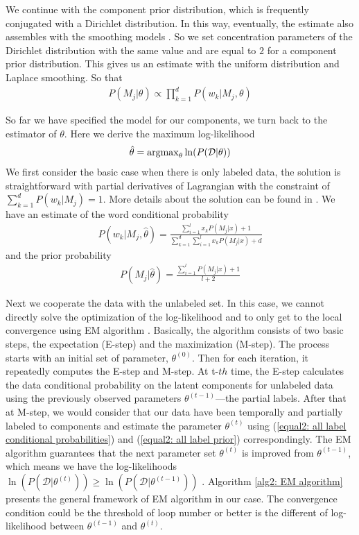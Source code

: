 We continue with the component prior distribution, which is frequently conjugated with a Dirichlet distribution. In this way, eventually, the estimate also assembles with the smoothing models \parencite{Chen1999}. So we set concentration parameters of the Dirichlet distribution with the same value and are equal to $2$ for a component prior distribution. This gives us an estimate with the uniform distribution and Laplace smoothing. So that
\begin{align}
	P(M_j|\theta) \propto \prod_{k=1}^{d} P(w_k | M_j, \theta)
\end{align}

So far we have specified the model for our components, we turn back to the estimator of $\theta$. Here we derive the maximum log-likelihood
\begin{align}
	\hat{\theta} = \operatorname{argmax}_{\theta}{\ln(P(\mathcal{D} | \theta))}
\end{align}
We first consider the basic case when there is only labeled data, the solution is straightforward with partial derivatives of Lagrangian with the constraint of $\sum_{k=1}^{d}{P(w_k | M_j)} = 1$. More details about the solution can be found in \parencite{Collins2013}. We have an estimate of the word conditional probability
\begin{align}
\label{equal2: all label conditional probabilities}
	P(w_k | M_j, \hat{\theta}) = \frac{
		\sum_{i=1}^{l}{x_k P(M_j|x)} + 1
	}{
		\sum_{k=1}^{d}\sum_{i=1}^{l}{x_k P(M_j|x)} + d
	}
\end{align}
and the prior probability
\begin{align}
\label{equal2: all label prior}
	P(M_j | \hat{\theta}) = \frac{
		\sum_{i=1}^{l} P(M_j | x) + 1
	}{
		l + 2
	}
\end{align}

Next we cooperate the data with the unlabeled set. In this case, we cannot directly solve the optimization of the log-likelihood and to only get to the local convergence using EM algorithm \parencite{10.2307/2984875}. Basically, the algorithm consists of two basic steps, the expectation (E-step) and the maximization (M-step). The process starts with an initial set of parameter, $\theta^{(0)}$. Then for each iteration, it repeatedly computes the E-step and M-step. At t-$th$ time, the E-step calculates the data conditional probability on the latent components for unlabeled data using the previously observed parameters $\theta^{(t-1)}$---the partial labels. After that at M-step, we would consider that our data have been temporally and partially labeled to components and estimate the parameter $\theta^{(t)}$ using (\ref{equal2: all label conditional probabilities}) and (\ref{equal2: all label prior}) correspondingly. The EM algorithm guarantees that the next parameter set $\theta^{(t)}$ is improved from $\theta^{(t-1)}$, which means we have the log-likelihoods $\ln(P(\mathcal{D}|\theta^{(t)})) \geq {\ln(P(\mathcal{D}|\theta^{(t-1)}))}$ \parencite{Borman2006}. Algorithm \ref{alg2: EM algorithm} presents the general framework of EM algorithm in our case. The convergence  condition could be the threshold of loop number or better is the different of log-likelihood between $\theta^{(t-1)}$ and $\theta^{(t)}$.

